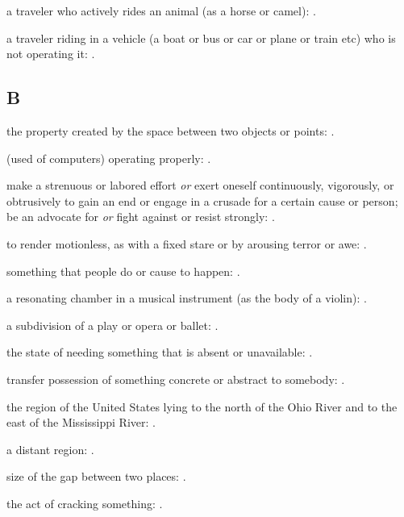  a traveler who actively rides an animal (as a horse or camel):   .

  a traveler riding in a vehicle (a boat or bus or car or plane or train etc) who is not operating it:   .

\subsection*{B}

  the property created by the space between two objects or points:   .

  (used of computers) operating properly: .

  make a strenuous or labored effort \textit{or} exert oneself continuously, vigorously, or obtrusively to gain an end or engage in a crusade for a certain cause or person; be an advocate for \textit{or} fight against or resist strongly: .

  to render motionless, as with a fixed stare or by arousing terror or awe:   .

  something that people do or cause to happen:   .

  a resonating chamber in a musical instrument (as the body of a violin):   .

  a subdivision of a play or opera or ballet: .

  the state of needing something that is absent or unavailable:   .

  transfer possession of something concrete or abstract to somebody: .

  the region of the United States lying to the north of the Ohio River and to the east of the Mississippi River:   .

  a distant region:   .

  size of the gap between two places:   .

  the act of cracking something:   .

